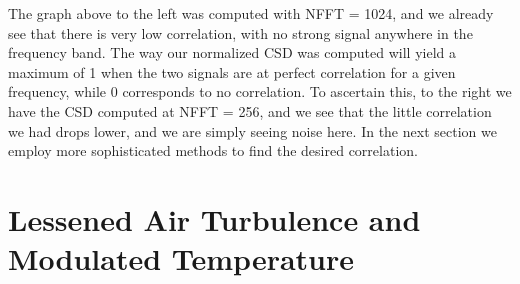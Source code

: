 \documentclass[11 pt]{article}
\begin{document}
The graph above to the left was computed with NFFT = 1024, and we already see that there is very low correlation, with no strong signal anywhere in the frequency band. The way our normalized CSD was computed will yield a maximum of 1 when the two signals are at perfect correlation for a given frequency, while 0 corresponds to no correlation. To ascertain this, to the right we have the CSD computed at NFFT = 256, and we see that the little correlation we had drops lower, and we are simply seeing noise here. In the next section we employ more sophisticated methods to find the desired correlation.


\section{Lessened Air Turbulence and Modulated Temperature}
\end{document}
